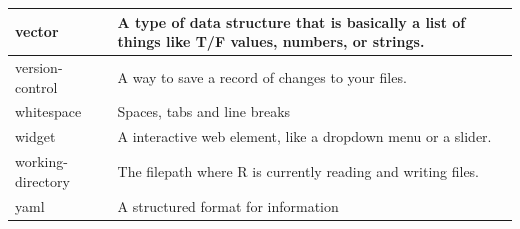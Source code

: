 \documentclass[
  oneside]{book}
\begin{document}
\begin{tabular}{l|l}
\hline
vector & A type of data structure that is basically a list of things like T/F values, numbers, or strings.\\
\hline
version-control & A way to save a record of changes to your files.\\
\hline
whitespace & Spaces, tabs and line breaks\\
\hline
widget & A interactive web element, like a dropdown menu or a slider.\\
\hline
working-directory & The filepath where R is currently reading and writing files.\\
\hline
yaml & A structured format for information\\
\hline
\end{tabular}

  
\end{document}
